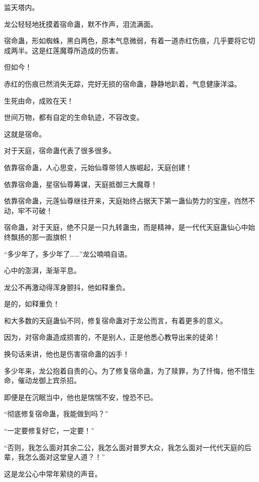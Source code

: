 
\begin{this_body}



监天塔内。

龙公轻轻地抚摸着宿命蛊，默不作声，泪流满面。

宿命蛊，形如蜘蛛，黑白两色，原本气息微弱，有着一道赤红伤痕，几乎要将它切成两半。这是红莲魔尊所造成的伤害。

但如今！

赤红的伤痕已然消失无踪，完好无损的宿命蛊，静静地趴着，气息健康洋溢。

生死由命，成败在天！

世间万物，都有自定的生命轨迹，不容改变。

这就是宿命。

对于天庭，宿命蛊代表了很多很多。

依靠宿命蛊，人心思变，元始仙尊带领人族崛起，天庭创建！

依靠宿命蛊，星宿仙尊筹谋，天庭抵御三大魔尊！

依靠宿命蛊，元莲仙尊继往开来，天庭始终占据天下第一蛊仙势力的宝座，岿然不动，牢不可破！

宿命蛊，对于天庭，绝不只是一只九转蛊虫，而是精神，是一代代天庭蛊仙心中始终飘扬的那一面旗帜！

“多少年了，多少年了……”龙公喃喃自语。

心中的澎湃，渐渐平息。

龙公不再激动得浑身颤抖，他如释重负。

是的，如释重负！

和大多数的天庭蛊仙不同，修复宿命蛊对于龙公而言，有着更多的意义。

因为，对宿命蛊造成损害的，不是别人，正是他悉心教导出来的徒弟！

换句话来讲，他也是伤害宿命蛊的凶手！

多少年来，龙公抱着自责的心。为了修复宿命蛊，为了赎罪，为了忏悔，他不惜生命，催动龙御上宾杀招。

即便是在沉眠当中，他也是惴惴不安，惶恐不已。

“彻底修复宿命蛊，我能做到吗？”

“一定要修复好它，一定要！”

“否则，我怎么面对其余二公，我怎么面对普罗大众，我怎么面对一代代天庭的后辈，我怎么面对这堂皇人道？！”

这是龙公心中常年萦绕的声音。


\end{this_body}
